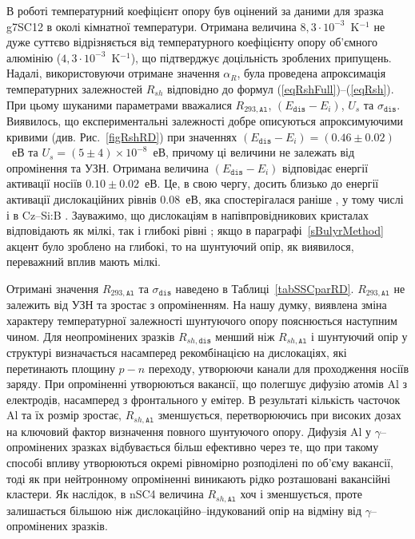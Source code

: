 В роботі температурний коефіцієнт опору був оцінений за даними для зразка g7SC12 в околі кімнатної температури.
Отримана величина $8,3\cdot10^{-3}$~K$^{-1}$ не дуже суттєво відрізняється від температурного
коефіцієнту опору об'ємного алюмінію ($4,3\cdot10^{-3}$~K$^{-1}$),
що підтверджує доцільність зроблених припущень.
Надалі, використовуючи отримане значення $\alpha_R$, була
проведена апроксимація температурних залежностей $R_{sh}$ відповідно до формул (\ref{eqRshFull})--(\ref{eqRsh}).
При цьому шуканими параметрами вважалися $R_{293,\mathtt{Al}}$, $(E_{\mathtt{dis}}-E_i)$, $U_s$ та $\sigma_{\mathtt{dis}}$.
Виявилось, що експериментальні залежності добре описуються апроксимуючими кривими (див. Рис.~\ref{figRshRD})
при значеннях $(E_{\mathtt{dis}}-E_i)=(0.46\pm0.02)$~еВ та $U_s=(5\pm4)\times10^{-8}$~еВ,
причому ці величини не залежать від опромінення та УЗН.
Отримана величина $(E_{\mathtt{dis}}-E_i)$ відповідає енергії активації носіїв $0.10\pm0.02$~еВ.
Це, в свою чергу, досить близько до енергії активації дислокаційних рівнів $0.08$~еВ,
яка спостерігалася раніше \cite{disl10:Castaldini,disl10:Isakova,disl10:Yur,disl10:Kveder,disl10:Trushin,Si:disl},
у тому числі і в Cz--Si:B \cite{disl10:Castaldini,disl10:Isakova,disl10:Yu}.
Зауважимо, що дислокаціям в напівпровідникових кристалах відповідають як мілкі,
так і глибокі рівні \cite{Disl:GaN};
якщо в параграфі~\ref{sBulyrMethod} акцент було зроблено на глибокі, то на шунтуючий опір, як виявилося,
переважний вплив мають мілкі.


Отримані значення $R_{293,\mathtt{Al}}$ та $\sigma_{\mathtt{dis}}$ наведено в Таблиці~\ref{tabSSCparRD}.
$R_{293,\mathtt{Al}}$ не залежить від УЗН та зростає з опроміненням.
На нашу думку, виявлена зміна характеру температурної залежності шунтуючого опору пояснюється
наступним чином.
Для неопромінених зразків $R_{sh,\mathtt{dis}}$ менший ніж $R_{sh,\mathtt{Al}}$ і шунтуючий опір
у структурі визначається насамперед рекомбінацією на дислокаціях, які перетинають площину $p-n$ переходу,
утворюючи канали для проходження носіїв заряду.
При опроміненні утворюються вакансії, що полегшує дифузію атомів Al з електродів, насамперед з фронтального у емітер.
В результаті кількість часточок Al та їх розмір зростає, $R_{sh,\mathtt{Al}}$ зменшується,
перетворюючись при високих дозах на ключовий фактор визначення повного шунтуючого опору.
Дифузія Al у $\gamma$--опромінених зразках відбувається більш ефективно через те, що
 при такому способі впливу утворюються окремі рівномірно розподілені по об'єму вакансії, тоді
 як при нейтронному опроміненні виникають рідко розташовані вакансійні кластери.
Як наслідок, в nSC4 величина $R_{sh,\mathtt{Al}}$ хоч і зменшується, проте залишається
більшою ніж дислокаційно--індукований опір на відміну від $\gamma$--опромінених зразків.


